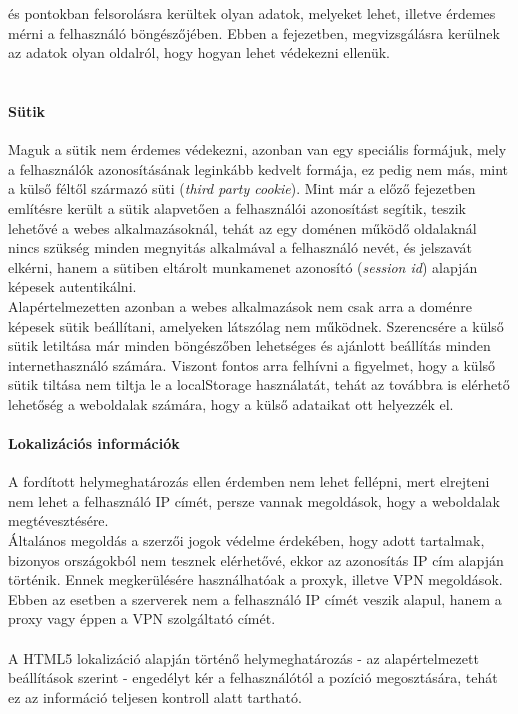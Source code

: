  és  pontokban felsorolásra kerültek olyan adatok, melyeket lehet, illetve érdemes mérni a felhasználó böngészőjében. Ebben a fejezetben, megvizsgálásra kerülnek az adatok olyan oldalról, hogy hogyan lehet védekezni ellenük.\hfill\\
\\
\paragraph{Sütik} %
\label{par:sutik_security}
Maguk a sütik nem érdemes védekezni, azonban van egy speciális formájuk, mely a felhasználók azonosításának leginkább kedvelt formája, ez pedig nem más, mint a külső féltől származó süti (\textit{third party cookie}). Mint már a előző fejezetben említésre került a sütik alapvetően a felhasználói azonosítást segítik, teszik lehetővé a webes alkalmazásoknál, tehát az egy doménen működő oldalaknál nincs szükség minden megnyitás alkalmával a felhasználó nevét, és jelszavát elkérni, hanem a sütiben eltárolt munkamenet azonosító (\textit{session id}) alapján képesek autentikálni. \hfill\\
Alapértelmezetten azonban a webes alkalmazások nem csak arra a doménre képesek sütik beállítani, amelyeken látszólag nem működnek. Szerencsére a külső sütik letiltása már minden böngészőben lehetséges és ajánlott beállítás minden internethasználó számára. Viszont fontos arra felhívni a figyelmet, hogy a külső sütik tiltása nem tiltja le a localStorage használatát, tehát az továbbra is elérhető lehetőség a weboldalak számára, hogy a külső adataikat ott helyezzék el.
\\
\paragraph{Lokalizációs információk} %
\label{par:lokalizációs_információk_security}
A fordított helymeghatározás ellen érdemben nem lehet fellépni, mert elrejteni nem lehet a felhasználó IP címét, persze vannak megoldások, hogy a weboldalak megtévesztésére.\hfill\\
Általános megoldás a szerzői jogok védelme érdekében, hogy adott tartalmak, bizonyos országokból nem tesznek elérhetővé, ekkor az azonosítás IP cím alapján történik. Ennek megkerülésére használhatóak a proxyk, illetve VPN megoldások. Ebben az esetben a szerverek nem a felhasználó IP címét veszik alapul, hanem a proxy vagy éppen a VPN szolgáltató címét.\hfill\\
\\
A HTML5 lokalizáció alapján történő helymeghatározás - az alapértelmezett beállítások szerint - engedélyt kér a felhasználótól a pozíció megosztására, tehát ez az információ teljesen kontroll alatt tartható.
\\
